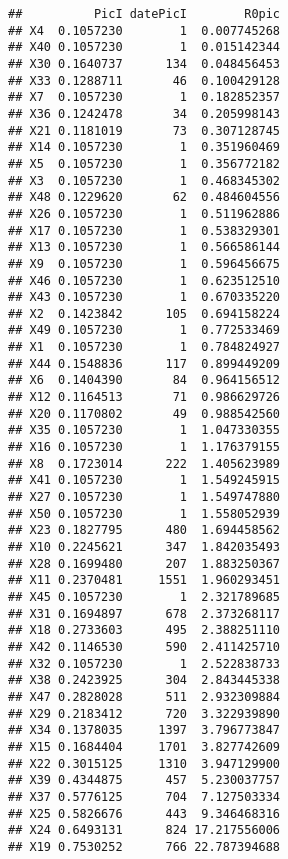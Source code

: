 \documentclass[
]{article}
\begin{document}
\begin{verbatim}
##          PicI datePicI        R0pic
## X4  0.1057230        1  0.007745268
## X40 0.1057230        1  0.015142344
## X30 0.1640737      134  0.048456453
## X33 0.1288711       46  0.100429128
## X7  0.1057230        1  0.182852357
## X36 0.1242478       34  0.205998143
## X21 0.1181019       73  0.307128745
## X14 0.1057230        1  0.351960469
## X5  0.1057230        1  0.356772182
## X3  0.1057230        1  0.468345302
## X48 0.1229620       62  0.484604556
## X26 0.1057230        1  0.511962886
## X17 0.1057230        1  0.538329301
## X13 0.1057230        1  0.566586144
## X9  0.1057230        1  0.596456675
## X46 0.1057230        1  0.623512510
## X43 0.1057230        1  0.670335220
## X2  0.1423842      105  0.694158224
## X49 0.1057230        1  0.772533469
## X1  0.1057230        1  0.784824927
## X44 0.1548836      117  0.899449209
## X6  0.1404390       84  0.964156512
## X12 0.1164513       71  0.986629726
## X20 0.1170802       49  0.988542560
## X35 0.1057230        1  1.047330355
## X16 0.1057230        1  1.176379155
## X8  0.1723014      222  1.405623989
## X41 0.1057230        1  1.549245915
## X27 0.1057230        1  1.549747880
## X50 0.1057230        1  1.558052939
## X23 0.1827795      480  1.694458562
## X10 0.2245621      347  1.842035493
## X28 0.1699480      207  1.883250367
## X11 0.2370481     1551  1.960293451
## X45 0.1057230        1  2.321789685
## X31 0.1694897      678  2.373268117
## X18 0.2733603      495  2.388251110
## X42 0.1146530      590  2.411425710
## X32 0.1057230        1  2.522838733
## X38 0.2423925      304  2.843445338
## X47 0.2828028      511  2.932309884
## X29 0.2183412      720  3.322939890
## X34 0.1378035     1397  3.796773847
## X15 0.1684404     1701  3.827742609
## X22 0.3015125     1310  3.947129900
## X39 0.4344875      457  5.230037757
## X37 0.5776125      704  7.127503334
## X25 0.5826676      443  9.346468316
## X24 0.6493131      824 17.217556006
## X19 0.7530252      766 22.787394688
\end{verbatim}
\end{document}

